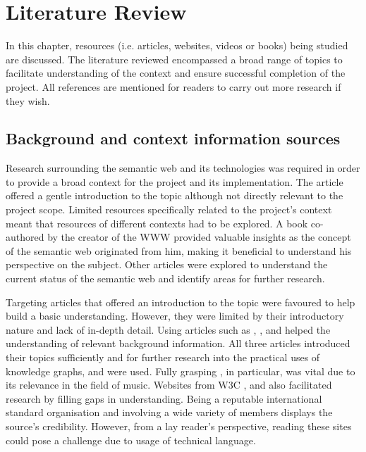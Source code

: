 \chapter{Literature Review}
In this chapter, resources (i.e. articles, websites, videos or books) being studied are discussed. The literature reviewed encompassed a broad range of topics to facilitate understanding of the context and ensure successful completion of the project. All references are mentioned for readers to carry out more research if they wish. 

\section{Background and context information sources}
\hspace{0.5cm} Research surrounding the semantic web and its technologies was required in order to provide a broad context for the project and its implementation. The article \cite{semanticweb} offered a gentle introduction to the topic although not directly relevant to the project scope. Limited resources specifically related to the project's context meant that resources of different contexts had to be explored. A book \cite{berners-TBLBook} co-authored by the creator of the WWW provided valuable insights as the concept of the semantic web originated from him, making it beneficial to understand his perspective on the subject. Other articles \cite{bizer2011linked} were explored to understand the current status of the semantic web and identify areas for further research. 

Targeting articles that offered an introduction to the topic were favoured to help build a basic understanding. However, they were limited by their introductory nature and lack of in-depth detail. Using articles such as \cite{ontology}, \cite{knowledgegraph}, \cite{studer_benjamins_fensel_1998} and \cite{rdf} helped the understanding of relevant background information. All three articles introduced their topics sufficiently and for further research into the practical uses of knowledge graphs, \cite{searchengine} and \cite{oramas2016sound} were used. Fully grasping \cite{oramas2016sound}, in particular, was vital due to its relevance in the field of music. Websites from W3C \cite{TTL}, \cite{w3crdf} and \cite{w3cvocabularies} also facilitated research by filling gaps in understanding. Being a reputable international standard organisation and involving a wide variety of members displays the source's credibility. However, from a lay reader's perspective, reading these sites could pose a challenge due to usage of technical language. 

